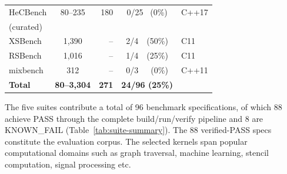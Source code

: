 \begin{table}[!htbp]
{\begin{tabular}{@{}lcrcl@{}}
HeCBench &    80--235    & 180 &  0/25 ~(0\%) & C++17 \\
(curated) &  & & & \\
XSBench          &    1{,}390    &  -- &  2/4~~(50\%) & C11   \\
RSBench          &    1{,}016    &  -- &  1/4~~(25\%) & C11   \\
mixbench         &       312     &  -- &  0/3~~~(0\%) & C++11 \\
\midrule
\textbf{Total}   & \textbf{80--3{,}304} & \textbf{271} & \textbf{24/96 (25\%)} & \\
\bottomrule
\end{tabular}
}
\end{table}


The five suites contribute a total of 96 benchmark specifications, of which 88 achieve PASS through the complete build/run/verify pipeline and 8 are KNOWN\_FAIL (Table~\ref{tab:suite-summary}). The 88 verified-PASS specs constitute the evaluation corpus. The selected kernels span popular computational domains such as graph traversal, machine learning, stencil computation, signal processing etc.



